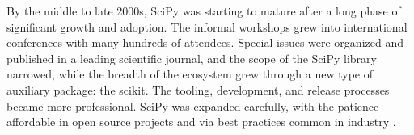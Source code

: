 \documentclass[fleqn,10pt]{wlscirep}
\begin{document}
%
%
%
%
%
%
%
%
%
%
%
%
%
%
%
%
%
%
%
%
%
%
%
%
%
%


By the middle to late 2000s, SciPy was starting to mature after a long phase of significant
growth and adoption.
The informal workshops grew into international conferences with many
hundreds of attendees. Special issues were organized and published in a
leading scientific journal\cite{dubois2007guest}, and the scope of the SciPy library
narrowed, while the breadth of the ecosystem grew
through a new type of auxiliary package: the scikit\cite{scikits-general}.
The tooling, development, and release processes became more professional.
SciPy was expanded carefully, with the patience affordable in open source 
projects and via best practices common in industry \cite{millman2014developing}.
\end{document}
